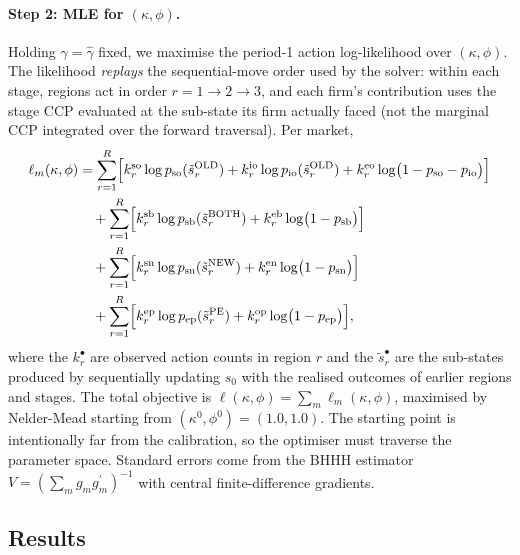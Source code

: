 \documentclass[12pt]{article}
\begin{document}
\paragraph{Step 2: MLE for $(\kappa, \phi)$.}
Holding $\gamma = \widehat{\gamma}$ fixed, we maximise the period-1 action
log-likelihood over $(\kappa, \phi)$. The likelihood \emph{replays} the
sequential-move order used by the solver: within each stage, regions act
in order $r = 1 \to 2 \to 3$, and each firm's contribution uses the stage
CCP evaluated at the sub-state its firm actually faced (not the marginal
CCP integrated over the forward traversal). Per market,
\begin{align}
  \ell_m(\kappa, \phi)
    &= \sum_{r=1}^{R}\Bigl[
         k^{\mathrm{so}}_r \log p_{\mathrm{so}}(\tilde{s}^{\mathrm{OLD}}_r)
       + k^{\mathrm{io}}_r \log p_{\mathrm{io}}(\tilde{s}^{\mathrm{OLD}}_r)
       + k^{\mathrm{eo}}_r \log\bigl(1 - p_{\mathrm{so}} - p_{\mathrm{io}}\bigr)
       \Bigr] \notag \\
    &\quad + \sum_{r=1}^{R}\Bigl[
         k^{\mathrm{sb}}_r \log p_{\mathrm{sb}}(\tilde{s}^{\mathrm{BOTH}}_r)
       + k^{\mathrm{eb}}_r \log\bigl(1 - p_{\mathrm{sb}}\bigr)
       \Bigr] \notag \\
    &\quad + \sum_{r=1}^{R}\Bigl[
         k^{\mathrm{sn}}_r \log p_{\mathrm{sn}}(\tilde{s}^{\mathrm{NEW}}_r)
       + k^{\mathrm{en}}_r \log\bigl(1 - p_{\mathrm{sn}}\bigr)
       \Bigr] \notag \\
    &\quad + \sum_{r=1}^{R}\Bigl[
         k^{\mathrm{ep}}_r \log p_{\mathrm{ep}}(\tilde{s}^{\mathrm{PE}}_r)
       + k^{\mathrm{op}}_r \log\bigl(1 - p_{\mathrm{ep}}\bigr)
       \Bigr],
  \label{eq:loglik_m}
\end{align}
where the $k^{\bullet}_r$ are observed action counts in region $r$ and the
$\tilde{s}^{\bullet}_r$ are the sub-states produced by sequentially
updating $s_0$ with the realised outcomes of earlier regions and stages.
The total objective is $\ell(\kappa, \phi) = \sum_m \ell_m(\kappa, \phi)$,
maximised by Nelder-Mead starting from $(\kappa^0, \phi^0) = (1.0, 1.0)$.
The starting point is intentionally far from the calibration, so the
optimiser must traverse the parameter space. Standard errors come from the
BHHH estimator $V = (\sum_m g_m g_m^\prime)^{-1}$ with central
finite-difference gradients.

\subsection{Results}
\end{document}
